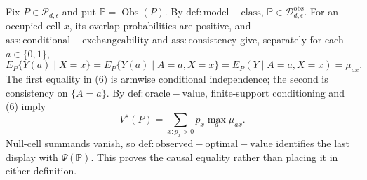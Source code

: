 Fix \(P\in\mathcal P_{d,\epsilon}\) and put \(\mathbb P=\operatorname{Obs}(P)\).  By \(\mathrm{def:model-class}\), \(\mathbb P\in\mathcal D_{d,\epsilon}^{\mathrm{obs}}\).  For an occupied cell \(x\), its overlap probabilities are positive, and \(\mathrm{ass:conditional-exchangeability}\) and \(\mathrm{ass:consistency}\) give, separately for each \(a\in\{0,1\}\),
\[
 E_P\{Y(a)\mid X=x\}
 =E_P\{Y(a)\mid A=a,X=x\}
 =E_P(Y\mid A=a,X=x)=\mu_{ax}.                                     \tag{6}
\]
The first equality in (6) is armwise conditional independence; the second is consistency on \(\{A=a\}\).  By \(\mathrm{def:oracle-value}\), finite-support conditioning and (6) imply
\[
 V^\star(P)=\sum_{x:p_x>0}p_x\max_a\mu_{ax}.
\]
Null-cell summands vanish, so \(\mathrm{def:observed-optimal-value}\) identifies the last display with \(\Psi(\mathbb P)\).  This proves the causal equality rather than placing it in either definition.